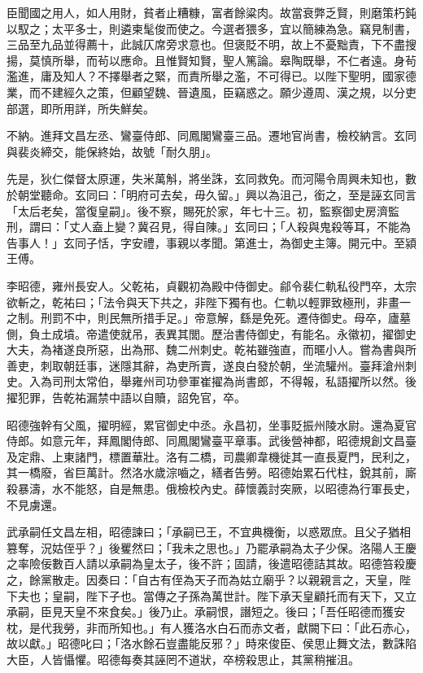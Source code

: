 \begin{pinyinscope}
 臣聞國之用人，如人用財，貧者止糟糠，富者餘粱肉。故當衰弊乏賢，則磨策朽鈍以馭之；太平多士，則遴柬髦俊而使之。今選者猥多，宜以簡練為急。竊見制書，三品至九品並得薦十，此誠仄席旁求意也。但褒貶不明，故上不憂黜責，下不盡搜揚，莫慎所舉，而茍以應命。且惟賢知賢，聖人篤論。皋陶既舉，不仁者遠。身茍濫進，庸及知人？不擇舉者之緊，而責所舉之濫，不可得已。以陛下聖明，國家德業，而不建經久之策，但顧望魏、晉遺風，臣竊惑之。願少遵周、漢之規，以分吏部選，即所用詳，所失鮮矣。



 不納。進拜文昌左丞、鸞臺侍郎、同鳳閣鸞臺三品。遷地官尚書，檢校納言。玄同與裴炎締交，能保終始，故號「耐久朋」。



 先是，狄仁傑督太原運，失米萬斛，將坐誅，玄同救免。而河陽令周興未知也，數於朝堂聽命。玄同曰：「明府可去矣，毋久留。」興以為沮己，銜之，至是誣玄同言「太后老矣，當復皇嗣」。後不察，賜死於家，年七十三。初，監察御史房濟監刑，謂曰：「丈人盍上變？冀召見，得自陳。」玄同曰；「人殺與鬼殺等耳，不能為告事人！」玄同子恬，字安禮，事親以孝聞。第進士，為御史主簿。開元中。至潁王傅。



 李昭德，雍州長安人。父乾祐，貞觀初為殿中侍御史。鄃令裴仁軌私役門卒，太宗欲斬之，乾祐曰；「法令與天下共之，非陛下獨有也。仁軌以輕罪致極刑，非畫一之制。刑罰不中，則民無所措手足。」帝意解，繇是免死。遷侍御史。母卒，廬墓側，負土成墳。帝遣使就吊，表異其閭。歷治書侍御史，有能名。永徽初，擢御史大夫，為褚遂良所惡，出為邢、魏二州刺史。乾祐雖強直，而暱小人。嘗為書與所善吏，刺取朝廷事，迷隱其辭，為吏所賣，遂良白發於朝，坐流驩州。臺拜滄州刺史。入為司刑太常伯，舉雍州司功參軍崔擢為尚書郎，不得報，私語擢所以然。後擢犯罪，告乾祐漏禁中語以自贖，詔免官，卒。



 昭德強幹有父風，擢明經，累官御史中丞。永昌初，坐事貶振州陵水尉。還為夏官侍郎。如意元年，拜鳳閣侍郎、同鳳閣鸞臺平章事。武後營神都，昭德規創文昌臺及定鼎、上東諸門，標置華壯。洛有二橋，司農卿韋機徙其一直長夏門，民利之，其一橋廢，省巨萬計。然洛水歲淙嚙之，繕者告勞。昭德始累石代柱，銳其前，廝殺暴濤，水不能怒，自是無患。俄檢校內史。薛懷義討突厥，以昭德為行軍長史，不見虜還。



 武承嗣任文昌左相，昭德諫曰；「承嗣已王，不宜典機衡，以惑眾庶。且父子猶相篡奪，況姑侄乎？」後矍然曰；「我未之思也。」乃罷承嗣為太子少保。洛陽人王慶之率險佞數百人請以承嗣為皇太子，後不許；固請，後遣昭德詰其故。昭德笞殺慶之，餘黨散走。因奏曰：「自古有侄為天子而為姑立廟乎？以親親言之，天皇，陛下夫也；皇嗣，陛下子也。當傳之子孫為萬世計。陛下承天皇顧托而有天下，又立承嗣，臣見天皇不來食矣。」後乃止。承嗣恨，譖短之。後曰；「吾任昭德而獲安枕，是代我勞，非而所知也。」有人獲洛水白石而赤文者，獻闕下曰：「此石赤心，故以獻。」昭德叱曰；「洛水餘石豈盡能反邪？」時來俊臣、侯思止舞文法，數誅陷大臣，人皆懾懼。昭德每奏其誣罔不道狀，卒榜殺思止，其黨稍摧沮。




\end{pinyinscope}
